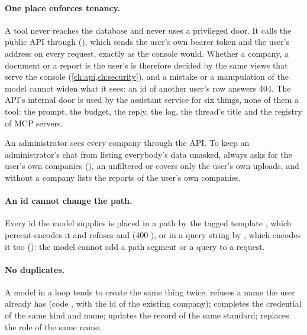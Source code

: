 \paragraph{One place enforces tenancy.} A tool never reaches the database and never uses a
privileged door. It calls the public API through  (),
which sends the user's own bearer token and the user's address on every request, exactly as
the console would. Whether a company, a document or a report is the user's is therefore
decided by the same views that serve the console (\cref{ch:api,ch:security}), and a mistake or
a manipulation of the model cannot widen what it sees: an id of another user's row answers
404. The API's internal door is used by the assistant service for six things, none of them a
tool: the prompt, the budget, the reply, the log, the thread's title and the registry of MCP
servers.

An administrator sees every company through the API. To keep an administrator's chat from
listing everybody's data unasked,  always asks for the user's own
companies (), an unfiltered  or
 covers only the user's own uploads, and 
without a company lists the reports of the user's own companies.

\paragraph{An id cannot change the path.} Every id the model supplies is placed in a path by
the tagged template , which percent-encodes it and refuses  and 
(400 ), or in a query string by , which encodes it too
(): the model cannot add a path segment or a query to a request.

\paragraph{No duplicates.} A model in a loop tends to create the same thing twice.
 refuses a name the user already has (code , with
the id of the existing company);  completes the credential of the same kind
and name;  updates the record of the same standard; 
replaces the role of the same name.

